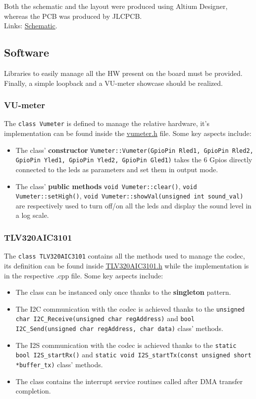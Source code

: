 \documentclass[10pt,a4]{article}
\begin{document}
Both the schematic and the layout were produced using Altium Designer, whereas the PCB was produced by JLCPCB.\\

Links: \href{https://github.com/AleDedor/STM32Nucleo-Codec-Shield/blob/main/Schematic/Nucleo_Codec_Shield.pdf}{\underline{Schematic}}.

\subsection{Software}
Libraries to easily manage all the HW present on the board must be provided. Finally, a simple loopback and a VU-meter showcase should be realized.

\subsubsection{VU-meter}
The \lstinline{class Vumeter} is defined to manage the relative hardware, it's implementation can be found inside the \href{https://github.com/AleDedor/STM32Nucleo-Codec-Shield/blob/main/NASlib/vumeter.h}{\underline{vumeter.h}} file. Some key aspects include:
\begin{itemize}
    \item The class' \textbf{constructor} \lstinline{Vumeter::Vumeter(GpioPin Rled1, GpioPin Rled2, GpioPin Yled1, GpioPin Yled2, GpioPin Gled1)} takes the 6 Gpios directly connected to the leds as parameters and set them in output mode.
    \item The class' \textbf{public methods} \lstinline{void Vumeter::clear()}, \lstinline{void Vumeter::setHigh()}, \lstinline{void Vumeter::showVal(unsigned int sound_val)} are respectively used to turn off/on all the leds and display the sound level in a log scale.
\end{itemize}

\subsubsection{TLV320AIC3101}
The \lstinline{class TLV320AIC3101} contains all the methods used to manage the codec, its definition can be found inside \href{https://github.com/AleDedor/STM32Nucleo-Codec-Shield/blob/main/NASlib/TLV320AIC3101.h}{\underline{TLV320AIC3101.h}} while the implementation is in the respective .cpp file. Some key aspects include:

\begin{itemize}
    \item The class can be instanced only once thanks to the \textbf{singleton} pattern.
    \item The I2C communication with the codec is achieved thanks to the \lstinline{unsigned char I2C_Receive(unsigned char regAddress)} and \lstinline{bool I2C_Send(unsigned char regAddress, char data)} class' methods.
    \item The I2S communication with the codec is achieved thanks to the \lstinline{static bool I2S_startRx()} and \lstinline{static void I2S_startTx(const unsigned short *buffer_tx)} class' methods.
    \item The class contains the interrupt service routines called after DMA transfer completion.
\end{itemize}
\end{document}
